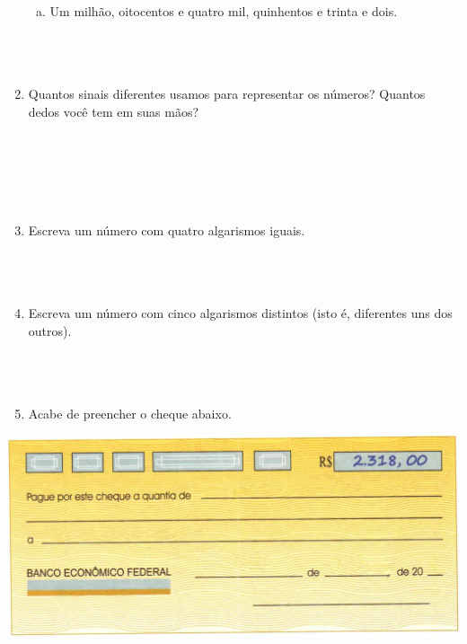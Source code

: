 \documentclass[a4paper,14pt]{article}
\begin{document}
\begin{multicols}{2}
\begin{enumerate}
\begin{enumerate}[a)]
				\item Um milhão, oitocentos e quatro mil, quinhentos e trinta e dois. \\\\\\\\
			\end{enumerate}
			\item Quantos sinais diferentes usamos para representar os números? Quantos dedos você tem em suas mãos? \\\\\\\\\\\\
			\item Escreva um número com quatro algarismos iguais. \\\\\\\\
			\item Escreva um número com cinco algarismos distintos (isto é, diferentes uns dos outros). \\\\\\\\
			\item Acabe de preencher o cheque abaixo. \\
		\end{enumerate}
	\end{multicols}
	\includegraphics[width=1\linewidth]{6FMA13_imagens/imagem1}
\end{document}
